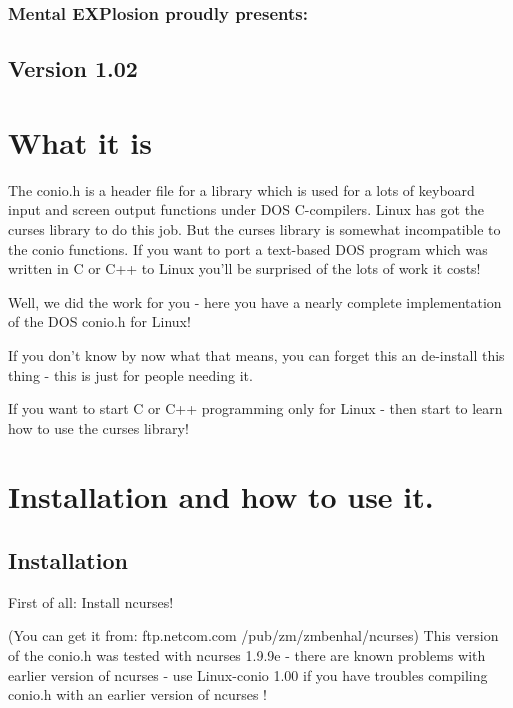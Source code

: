 \documentclass[10pt,a4paper,oneside,onecolumn]{article}
\begin{document}
\subsubsection*{Mental EXPlosion proudly presents:}


\vspace*{\fill}
\vspace*{\fill}


\subsection*{\centering Version 1.02}

\tableofcontents


\section{What it is}

The conio.h is a header file for a library which is used for a lots
of keyboard input and screen output functions under DOS C-compilers.
Linux has got the curses library to do this job. But the curses library
is somewhat incompatible to the conio functions. If you want to port
a text-based DOS program which was written in C or C++ to Linux you'll
be surprised of the lots of work it costs!

Well, we did the work for you - here you have a nearly complete implementation
of the DOS conio.h for Linux!

If you don't know by now what that means, you can forget this an de-install
this thing - this is just for people needing it.

If you want to start C or C++ programming only for Linux - then start
to learn how to use the curses library!


\section{Installation and how to use it.}


\subsection{Installation}

First of all: Install ncurses! 

(You can get it from: ftp.netcom.com /pub/zm/zmbenhal/ncurses) This
version of the conio.h was tested with ncurses 1.9.9e - there are
known problems with earlier version of ncurses - use Linux-conio 1.00
if you have troubles compiling conio.h with an earlier version of
ncurses !
\end{document}
